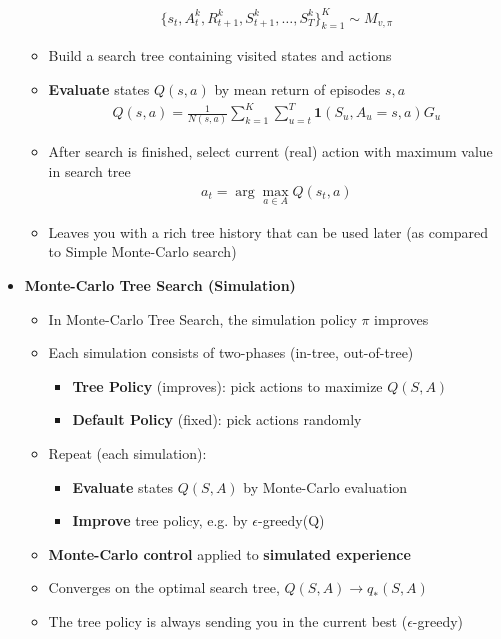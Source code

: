 \documentclass[12pt]{article}
\begin{document}
\begin{itemize}
\begin{itemize}
\begin{gather*}
        \{s_t, A^k_t, R^k_{t+1}, S^k_{t+1}, \dots, S^k_T\}^K_{k=1} \sim M_{v, \pi}
      \end{gather*}
      \item Build a search tree containing visited states and actions
      \item \textbf{Evaluate} states $Q(s,a)$ by mean return of episodes $s, a$
      \begin{gather*}
        Q(s, a) = \frac{1}{N(s, a)}\sum\limits_{k=1}^K \sum\limits_{u=t}^T \textbf{1}(S_u, A_u = s, a)G_u
      \end{gather*}
      \item After search is finished, select current (real) action with maximum
      value in search tree
      \begin{gather*}
        a_t = \arg\max\limits_{a \in A} Q(s_t, a)
      \end{gather*}
      \item Leaves you with a rich tree history that can be used later (as compared to Simple Monte-Carlo search)
    \end{itemize}
    \item \textbf{Monte-Carlo Tree Search (Simulation)}
    \begin{itemize}
      \item In Monte-Carlo Tree Search, the simulation policy $\pi$ improves
      \item Each simulation consists of two-phases (in-tree, out-of-tree)
      \begin{itemize}
        \item \textbf{Tree Policy} (improves): pick actions to maximize $Q(S, A)$
        \item \textbf{Default Policy} (fixed): pick actions randomly
      \end{itemize}
      \item Repeat (each simulation):
      \begin{itemize}
        \item \textbf{Evaluate} states $Q(S, A)$ by Monte-Carlo evaluation
        \item \textbf{Improve} tree policy, e.g. by $\epsilon$-greedy(Q)
      \end{itemize}
      \item \textbf{Monte-Carlo control} applied to \textbf{simulated experience}
      \item Converges on the optimal search tree, $Q(S, A) \rightarrow q_*(S, A)$
      \item The tree policy is always sending you in the current best ($\epsilon$-greedy)

\end{itemize}
\end{itemize}
\end{document}
